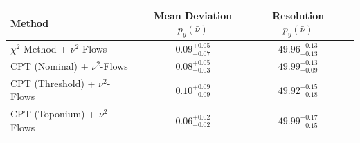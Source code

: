     \begin{tabular}{lccc}
        \toprule
        Method & Mean Deviation $p_{y}(\bar{\nu})$ & Resolution $p_{y}(\bar{\nu})$ \\
        \midrule
        $\chi^2$-Method + $\nu^2$-Flows & $0.09^{+0.05}_{-0.07}$ & $49.96^{+0.13}_{-0.13}$ \\
        CPT (Nominal) + $\nu^2$-Flows & $0.08^{+0.05}_{-0.03}$ & $49.99^{+0.13}_{-0.09}$ \\
        CPT (Threshold) + $\nu^2$-Flows & $0.10^{+0.09}_{-0.09}$ & $49.92^{+0.15}_{-0.18}$ \\
        CPT (Toponium) + $\nu^2$-Flows & $0.06^{+0.02}_{-0.02}$ & $49.99^{+0.17}_{-0.15}$ \\
        \bottomrule
    \end{tabular}